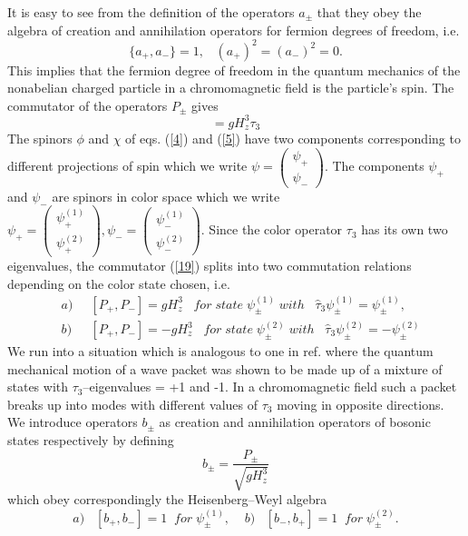\documentclass[a4paper,12pt,a4]{article}
\begin{document}
It is easy to see from the definition of the operators $a_{\pm}$
that they obey the algebra of creation and annihilation operators
for fermion degrees of freedom, i.e.
$$
\{a_+,a_-\}=1, \;\;\; (a_+)^2 = (a_-)^2 = 0.
$$
This implies that the fermion degree of freedom in the
quantum mechanics
of the nonabelian charged particle in a chromomagnetic field is
the particle's spin. The commutator of the operators
$P_{\pm}$ gives
\begin{equation}
[P_+, P_-]=gH^3_z\tau_3
\label{19}
\end{equation}
 The spinors $\phi$
and $\chi$ of eqs. (\ref{4})  and (\ref{5})
 have two components corresponding to different
projections of spin which we write $\psi =\left(\begin{array}{c} \psi_+\\
\psi_-\end{array}\right)$.
 The components $\psi_+$ and $ \psi_-$
are spinors in
color space which  we write  
$\psi_+ =\left(\begin{array}{c} \psi^{(1)}_+\\
\psi^{(2)}_+\end{array}\right)
, \psi_- =\left(\begin{array}{c} \psi^{(1)}_-\\
\psi^{(2)}_-\end{array}\right)$.
Since the color operator $\tau_3$ has its own two eigenvalues, the commutator
(\ref{19}) splits into two commutation relations
depending on the color state chosen, i.e.
\begin{eqnarray}
&a)&\;\; [P_+,P_-]=gH^3_z \;\;\;
 for \; state \; \psi^{(1)}_{\pm} \; with \;\;\;
 {\hat \tau}_3\psi^{(1)}_{\pm}=\psi^{(1)}_{\pm},
\nonumber\\
&b)& \;\;[P_+,P_-]=-gH^3_z \;\;\; for \; state 
\; \psi^{(2)}_{\pm} \;  with \;\;\;
  {\hat \tau}_3\psi^{(2)}_{\pm}=-\psi^{(2)}_{\pm}
\label{20}
\end{eqnarray}
We run into a situation which is analogous to one
in ref.\cite{12} where the quantum mechanical motion of
a wave packet was shown to be made up of a mixture of
states with $\tau_3$--eigenvalues = +1 and -1. 
In a chromomagnetic field  such
a packet breaks up into modes with different values
of $\tau_3$ moving in opposite directions.
We introduce operators $b_{\pm}$ as
creation and annihilation operators
of bosonic states respectively by defining 
$$
b_{\pm} = \frac{P_{\pm}}{\sqrt{gH^3_z}}
$$
which obey
correspondingly  the Heisenberg--Weyl algebra
\begin{equation}
a) \;\;\; [b_+,b_-] = 1 \;\; for \; \psi^{(1)}_{\pm},
 \;\;\;\; b)\;\;\; [b_-, b_+]= 1
\;\; for \; \psi^{(2)}_{\pm}.
\label{21}
\end{equation}
\end{document}
